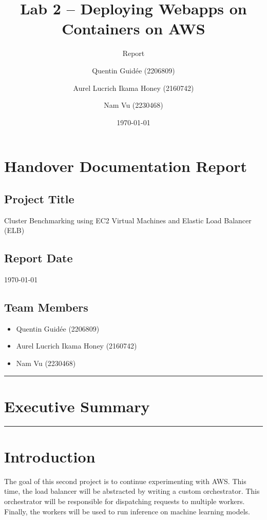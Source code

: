 \documentclass[letterpaper,headings=standardclasses,parskip=half]{scrartcl}
\title{Lab 2 – Deploying Webapps on Containers on AWS}
\subtitle{Report}
\author{
    Quentin Guidée (2206809) 
    \and
    Aurel Lucrich Ikama Honey (2160742)
    \and
    Nam Vu (2230468)
}
\date{\today}
\newcommand{\todo}{{\color{red}{TODO}}}
\begin{document}
\maketitle
\thispagestyle{empty}

\clearpage
{}
\tableofcontents

\clearpage
\section*{Handover Documentation Report}

\subsection*{Project Title}

Cluster Benchmarking using EC2 Virtual Machines and Elastic Load Balancer (ELB)

\subsection*{Report Date}

\today

\subsection*{Team Members}

\begin{itemize}
    \item Quentin Guidée (2206809)
    \item Aurel Lucrich Ikama Honey (2160742)
    \item Nam Vu (2230468)
\end{itemize}

\noindent\rule{\textwidth}{0.3pt}

\section*{Executive Summary}

\todo

\noindent\rule{\textwidth}{0.3pt}

\section{Introduction}

The goal of this second project is to continue experimenting with AWS.
This time, the load balancer will be abstracted by writing a custom orchestrator.
This orchestrator will be responsible for dispatching requests to multiple workers.
Finally, the workers will be used to run inference on machine learning models.
\end{document}
